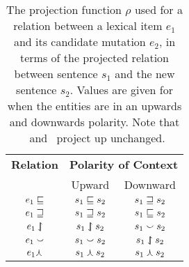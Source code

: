 \begin{table}[t]
	\begin{center}
	\begin{tabular}{c|cc}
    \textbf{Relation} & \multicolumn{2}{c}{\textbf{Polarity of Context}} \\
             & Upward & Downward \\
    \hline
     $e_1 \sqsubseteq     $ & $s_1 \sqsubseteq     s_2$ & $s_1 \sqsupseteq     s_2$ \\ 
     $e_1 \sqsupseteq     $ & $s_1 \sqsupseteq     s_2$ & $s_1 \sqsubseteq     s_2$ \\ 
     $e_1 \downharpoonleft\hspace{-1.25mm}\upharpoonright   $ & $s_1 \downharpoonleft\hspace{-1.25mm}\upharpoonright   s_2$ & $s_1 \smallsmile       s_2$ \\ 
     $e_1 \smallsmile       $ & $s_1 \smallsmile       s_2$ & $s_1 \downharpoonleft\hspace{-1.25mm}\upharpoonright   s_2$ \\ 
     $e_1 \curlywedge      $ & $s_1 \curlywedge      s_2$ & $s_1 \curlywedge      s_2$ \\ 
	\end{tabular}
	\caption{
    The projection function $\rho$ used for a relation between
       a lexical item $e_1$ and
      its candidate mutation $e_2$, in terms of the projected relation
      between sentence $s_1$ and the new sentence $s_2$.
    Values are given for when the entities are in an upwards and
      downwards polarity.
    Note that \equivalent\ and \independent\ project up unchanged.
		\label{tab:projectivity}
	}
	\end{center}
\end{table}




